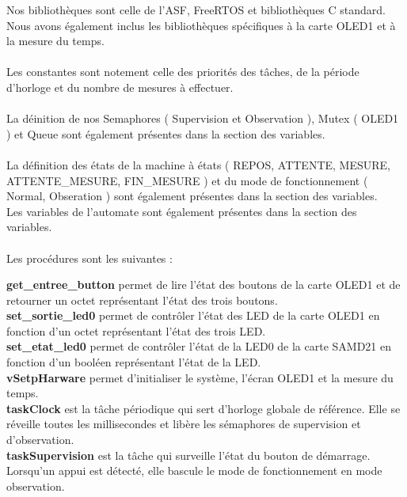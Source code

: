 Nos bibliothèques sont celle de l'ASF, FreeRTOS et bibliothèques C standard. Nous avons également inclus les bibliothèques spécifiques à la carte OLED1 et à la mesure du temps. \\
\\

Les constantes sont notement celle des priorités des tâches, de la période d'horloge et du nombre de mesures à effectuer. \\
\\

La déinition de nos Semaphores ( Supervision et Observation ), Mutex ( OLED1 ) et Queue sont également présentes dans la section des variables. \\
\\

La définition des états de la machine à états ( REPOS, ATTENTE, MESURE, ATTENTE\_MESURE, FIN\_MESURE ) et du mode de fonctionnement ( Normal, Obseration ) sont également présentes dans la section des variables. 
\\

Les variables de l'automate sont également présentes dans la section des variables. \\
\\

Les procédures sont les suivantes :

\textbf{get\_entree\_button} permet de lire l'état des boutons de la carte OLED1 et de retourner un octet représentant l'état des trois boutons. \\

\textbf{set\_sortie\_led0} permet de contrôler l'état des LED de la carte OLED1 en fonction d'un octet représentant l'état des trois LED. \\

\textbf{set\_etat\_led0} permet de contrôler l'état de la LED0 de la carte SAMD21 en fonction d'un booléen représentant l'état de la LED. \\

\textbf{vSetpHarware} permet d'initialiser le système, l'écran OLED1 et la mesure du temps. \\

\textbf{taskClock} est la tâche périodique qui sert d'horloge globale de référence. Elle se réveille toutes les millisecondes et libère les sémaphores de supervision et d'observation. \\

\textbf{taskSupervision} est la tâche qui surveille l'état du bouton de démarrage. Lorsqu'un appui est détecté, elle bascule le mode de fonctionnement en mode observation. \\

